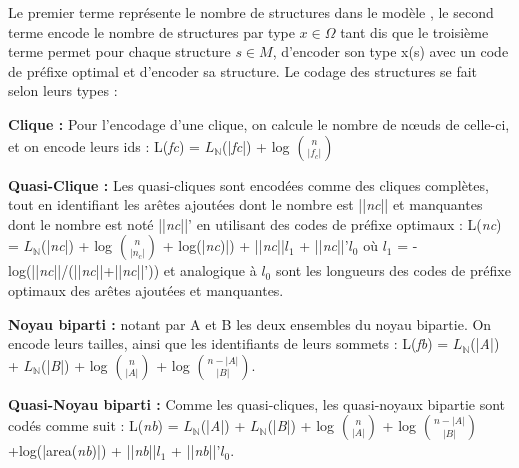 Le premier terme représente le nombre de structures dans le modèle  %
, le second terme encode le nombre de structures par type $x \in \Omega$ tant dis que le troisième terme permet pour chaque structure $s \in \textit{M}$, d'encoder son type x(s) avec un code de préfixe optimal et d'encoder sa structure. Le codage des structures se fait selon leurs types :

\textbf{Clique :} Pour l'encodage d'une clique, on calcule le nombre de nœuds de celle-ci, et on encode leurs ids :
L(\textit{fc}) = $L_{\mathbb{N}}$(|\textit{fc}|) + log ${n}\choose{|f_{c}|}$

\textbf{Quasi-Clique :} Les quasi-cliques sont encodées comme des cliques complètes, tout en identifiant les arêtes ajoutées dont le nombre est ||\textit{nc}|| et manquantes dont le nombre est noté ||\textit{nc}||' en utilisant des codes de préfixe optimaux : 
L(\textit{nc}) = $L_{\mathbb{N}}$(|\textit{nc}|) + log ${n}\choose{|n_{c}|}$ + log(|\textit{nc})|) + ||\textit{nc}||\textit{$l_{1}$} +  ||\textit{nc}||'\textit{$l_{0}$}
où \textit{$l_{1}$} = - log(||\textit{nc}||/(||\textit{nc}||+||\textit{nc}||')) et analogique à \textit{$l_{0}$} sont les longueurs des codes de préfixe optimaux des arêtes  ajoutées et manquantes.

\textbf{Noyau biparti :} notant par A et B les deux ensembles du noyau bipartie. On encode leurs tailles, ainsi que les identifiants de leurs sommets : 
L(\textit{fb}) = $L_{\mathbb{N}}$(|\textit{A}|) + $L_{\mathbb{N}}$(|\textit{B}|) + log ${n}\choose{|A|}$ + log ${n-|A|}\choose{|B|}$.

\textbf{Quasi-Noyau biparti :} Comme les quasi-cliques, les quasi-noyaux bipartie sont codés comme suit :
L(\textit{nb}) = $L_{\mathbb{N}}$(|\textit{A}|) + $L_{\mathbb{N}}$(|\textit{B}|) + log ${n}\choose{|A|}$  + log ${n-|A|}\choose{|B|}$+log(|area(\textit{nb})|) + ||\textit{nb}||\textit{$l_{1}$} + ||\textit{nb}||'\textit{$l_{0}$}.

